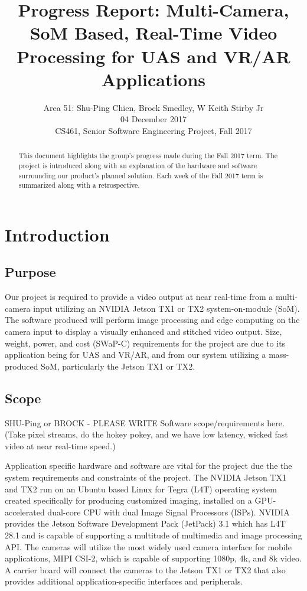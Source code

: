 \documentclass[letterpaper,10pt,serif,draftclsnofoot,onecolumn,compsoc,titlepage]{IEEEtran}
\title{Progress Report: Multi-Camera, SoM Based, Real-Time Video Processing for UAS and VR/AR Applications}
\author{Area 51: Shu-Ping Chien, Brock Smedley, W Keith Stirby Jr \\ 04 December 2017 \\ CS461, Senior Software Engineering Project, Fall 2017}
\begin{document}
\begin{titlepage}
\maketitle

\begin{abstract}

This document highlights the group's progress made during the Fall 2017 term. The 
project is introduced along with an explanation of the hardware and software 
surrounding our product's planned solution. Each week of the Fall 2017 term is 
summarized along with a retrospective. \\

\thispagestyle{empty}
\end{abstract}
\end{titlepage}

\newpage
\tableofcontents

\newpage

\section{Introduction}

\subsection{Purpose}

Our project is required to provide a video output at near real-time from a 
multi-camera input utilizing an NVIDIA Jetson TX1 or TX2 system-on-module (SoM). 
The software produced will perform image processing and edge computing on the 
camera input to display a visually enhanced and stitched video output. 
Size, weight, power, and cost (SWaP-C) requirements for the project are due 
to its application being for UAS and VR/AR, and from our system utilizing a 
mass-produced SoM, particularly the Jetson TX1 or TX2.  

\subsection{Scope}
 
SHU-Ping or BROCK - PLEASE WRITE
Software scope/requirements here. (Take pixel streams, do the 
hokey pokey, and we have low latency, wicked fast video at near real-time speed.)
 
Application specific hardware and software are vital for the project due the the 
system requirements and constraints of the project.
The NVIDIA Jetson TX1 and TX2 run on an Ubuntu based Linux for Tegra (L4T) operating 
system created specifically for producing customized imaging, installed on a 
GPU-accelerated dual-core CPU with dual Image Signal Processors (ISPs). 
NVIDIA provides the Jetson Software Development Pack (JetPack) 3.1 which has L4T 28.1 
and is capable of supporting a multitude of multimedia and image processing API. 
The cameras will utilize the most widely used camera interface for mobile applications, 
MIPI CSI-2, which is capable of supporting 1080p, 4k, and 8k video. 
A carrier board will connect the cameras to the Jetson TX1 or TX2 that also provides 
additional application-specific interfaces and peripherals. \\
\end{document}
